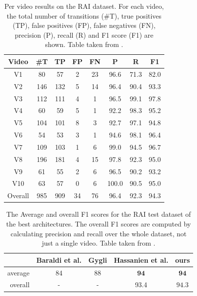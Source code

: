 \begin{table}[b]
    \centering
    \begin{tabular}{|c|c|c|c|c|c|c|c|}
        \hline
        \textbf{Video} & \textbf{\#T}   & \textbf{TP}    & \textbf{FP}    & \textbf{FN}    & \textbf{P}     & \textbf{R}     & \textbf{F1}   \\
        \hline
        V1       &    80 &    57 &     2 &    23 & 96.6 & 71.3 & 82.0\\
        V2       &   146 &   132 &     5 &    14 & 96.4 & 90.4 & 93.3\\
        V3       &   112 &   111 &     4 &     1 & 96.5 & 99.1 & 97.8\\
        V4       &    60 &    59 &     5 &     1 & 92.2 & 98.3 & 95.2\\
        V5       &   104 &   101 &     8 &     3 & 92.7 & 97.1 & 94.8\\
        V6       &    54 &    53 &     3 &     1 & 94.6 & 98.1 & 96.4\\
        V7       &   109 &   103 &     1 &     6 & 99.0 & 94.5 & 96.7\\
        V8       &   196 &   181 &     4 &    15 & 97.8 & 92.3 & 95.0\\
        V9       &    61 &    55 &     2 &     6 & 96.5 & 90.2 & 93.2\\
        V10      &    63 &    57 &     0 &     6 &100.0 & 90.5 & 95.0\\
        \hline
        Overall  &   985 &   909 &    34 &    76 & 96.4 & 92.3 & 94.3\\
        \hline
    \end{tabular}
    
    \caption[Per video results on the RAI dataset]{Per video results on the RAI dataset. For each video, the total number of transitions (\#T), true positives (TP), false positives (FP), false negatives (FN), precision (P), recall (R) and F1 score (F1) are shown. Table taken from \cite{soucek2019transnet}.}
    \label{tb:resultsRAI}
\end{table}


\begin{table}
    \centering
    \begin{tabular}{r|c|c|c|c}
        & Baraldi et al. & Gygli & Hassanien et al. & ours \\
        \hline
        average & 84 \cite{Baraldi15} & 88 \cite{Gygli18} & $\mathbf{94}$ \cite{Hassanien17} & $\mathbf{94}$ \\
        overall & - & - & 93.4 \cite{Hassanien17} & $\mathbf{94.3}$ \\
    \end{tabular}
    
    \caption[Performance comparison of related works on the RAI dataset]{The Average and overall F1 scores for the RAI test dataset of the best architectures. The overall F1 scores are computed by calculating precision and recall over the whole dataset, not just a single video. Table taken from \cite{soucek2019transnet}.}
    \label{tb:shotDetectors}
\end{table}
